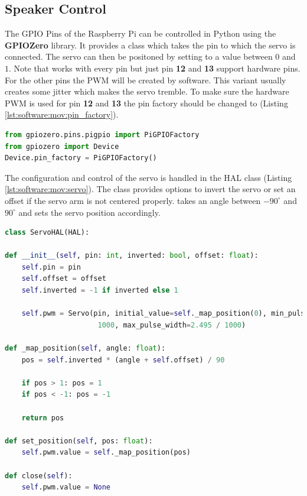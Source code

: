 \subsection{Speaker Control}

The GPIO Pins of the Raspberry Pi can be controlled in Python using the \textbf{GPIOZero} library. It provides a class  which takes the pin to which the servo is connected. The servo can then be positoned by setting  to a value between $0$ and $1$. Note that  works with every pin but just pin \textbf{12} and \textbf{13} support hardware pins. For the other pins the PWM will be created by software. This variant usually creates some jitter which makes the servo tremble. To make sure the hardware PWM is used for pin \textbf{12} and \textbf{13} the pin factory should be changed to  (Listing \ref{lst:software:mov:pin_factory}).\cite{nuttall_gpio_2021}
%
\begin{mdframed}
\begin{lstlisting}[language=Python, caption=Changing the pin factory, label=lst:software:mov:pin_factory]
from gpiozero.pins.pigpio import PiGPIOFactory
from gpiozero import Device
Device.pin_factory = PiGPIOFactory()
\end{lstlisting}
\end{mdframed}
%
The configuration and control of the servo is handled in the HAL class  (Listing \ref{lst:software:mov:servo}). The class provides options to invert the servo or set an offset if the servo arm is not centered properly.  takes an angle between $-90^\circ$ and $90^\circ$ and sets the servo position accordingly.
%
\begin{mdframed}
\begin{lstlisting}[language=Python, caption=Servo configuration and control, label=lst:software:mov:servo]
class ServoHAL(HAL):

def __init__(self, pin: int, inverted: bool, offset: float):
    self.pin = pin
    self.offset = offset
    self.inverted = -1 if inverted else 1

    self.pwm = Servo(pin, initial_value=self._map_position(0), min_pulse_width=0.615 /
                      1000, max_pulse_width=2.495 / 1000)

def _map_position(self, angle: float):
    pos = self.inverted * (angle + self.offset) / 90

    if pos > 1: pos = 1
    if pos < -1: pos = -1

    return pos

def set_position(self, pos: float):
    self.pwm.value = self._map_position(pos)

def close(self):
    self.pwm.value = None
\end{lstlisting}
\end{mdframed}
